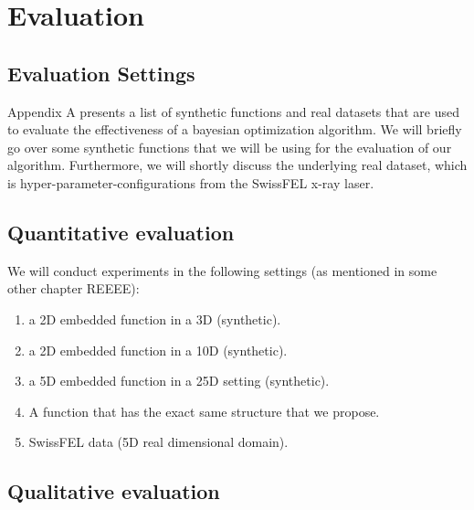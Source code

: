 \chapter{Evaluation}

\ifpdf
    \graphicspath{{Chapter6/Figs/Raster/}{Chapter6/Figs/PDF/}{Chapter6/Figs/}}
\else
    \graphicspath{{Chapter6/Figs/Vector/}{Chapter6/Figs/}}
\fi

\section{Evaluation Settings}

Appendix A presents a list of synthetic functions and real datasets that are used to evaluate the effectiveness of a bayesian optimization algorithm. 
We will briefly go over some synthetic functions that we will be using for the evaluation of our algorithm.
Furthermore, we will shortly discuss the underlying real dataset, which is hyper-parameter-configurations from the SwissFEL x-ray laser.

\section{Quantitative evaluation}

We will conduct experiments in the following settings (as mentioned in some other chapter REEEE):

\begin{enumerate}
\item a 2D embedded function in a 3D (synthetic).
\item a 2D embedded function in a 10D (synthetic).
\item a 5D embedded function in a 25D setting (synthetic).
\item A function that has the exact same structure that we propose.
\item SwissFEL data (5D real dimensional domain).
\end{enumerate}

\section{Qualitative evaluation}


